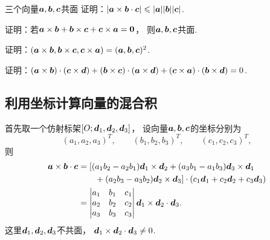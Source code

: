\begin{example}
三个向量\(\boldsymbol{a},\boldsymbol{b},\boldsymbol{c}\)共面
证明：\(\abs{\boldsymbol{a}\times\boldsymbol{b}\cdot\boldsymbol{c}}
\leqslant \abs{\boldsymbol{a}} \abs{\boldsymbol{b}} \abs{\boldsymbol{c}}\).
\end{example}

\begin{example}
证明：若\(\boldsymbol{a}\times\boldsymbol{b}
+ \boldsymbol{b}\times\boldsymbol{c}
+ \boldsymbol{c}\times\boldsymbol{a}
= \boldsymbol{0}\)，
则\(\boldsymbol{a},\boldsymbol{b},\boldsymbol{c}\)共面.
\end{example}

\begin{example}
证明：\((\boldsymbol{a}\times\boldsymbol{b},\boldsymbol{b}\times\boldsymbol{c},\boldsymbol{c}\times\boldsymbol{a})
= (\boldsymbol{a},\boldsymbol{b},\boldsymbol{c})^2\).
\end{example}

\begin{example}
证明：\((\boldsymbol{a}\times\boldsymbol{b})\cdot(\boldsymbol{c}\times\boldsymbol{d})
+ (\boldsymbol{b}\times\boldsymbol{c})\cdot(\boldsymbol{a}\times\boldsymbol{d})
+ (\boldsymbol{c}\times\boldsymbol{a})\cdot(\boldsymbol{b}\times\boldsymbol{d})
= 0\).
\end{example}

\subsection{利用坐标计算向量的混合积}
首先取一个仿射标架\([O;\boldsymbol{d}_1,\boldsymbol{d}_2,\boldsymbol{d}_3]\)，
设向量\(\boldsymbol{a},\boldsymbol{b},\boldsymbol{c}\)的坐标分别为\[
	(a_1,a_2,a_3)^T, \qquad
	(b_1,b_2,b_3)^T, \qquad
	(c_1,c_2,c_3)^T,
\]
则\begin{equation}
\begin{split}
	\boldsymbol{a}\times\boldsymbol{b}\cdot\boldsymbol{c}
	&= [(a_1 b_2 - a_2 b_1) \boldsymbol{d}_1 \times \boldsymbol{d}_2
	+ (a_3 b_1 - a_1 b_3) \boldsymbol{d}_3 \times \boldsymbol{d}_1 \\
	&\hspace{20pt}
	+ (a_2 b_3 - a_3 b_2) \boldsymbol{d}_2 \times \boldsymbol{d}_3]
	\cdot (c_1 \boldsymbol{d}_1 + c_2 \boldsymbol{d}_2 + c_3 \boldsymbol{d}_3) \\
	&= \begin{vmatrix}
		a_1 & b_1 & c_1 \\
		a_2 & b_2 & c_2 \\
		a_3 & b_3 & c_3
	\end{vmatrix}
	\boldsymbol{d}_1 \times \boldsymbol{d}_2 \cdot \boldsymbol{d}_3.
\end{split}
\end{equation}
这里\(\boldsymbol{d}_1,\boldsymbol{d}_2,\boldsymbol{d}_3\)不共面，
\(\boldsymbol{d}_1\times\boldsymbol{d}_2\cdot\boldsymbol{d}_3\neq0\).

